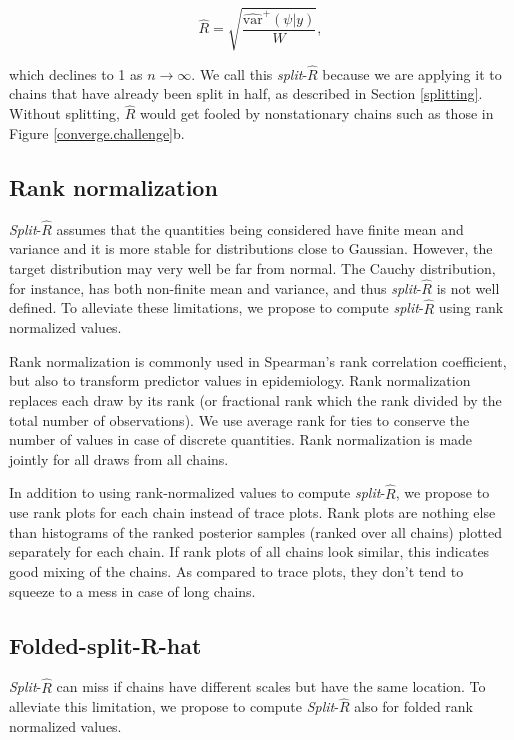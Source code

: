 \documentclass[11pt]{article}
\begin{document}
\begin{equation}
\label{rhat.defined}
\widehat{R} = \sqrt{\frac{\widehat{\mbox{var}}^+(\psi|y)}{W}},
\end{equation}

which declines to 1 as $n\rightarrow\infty$. We call this {\em split}-$\widehat{R}$ 
because we are applying it to chains that have already been split in half, as 
described in Section \ref{splitting}. Without splitting, $\widehat{R}$ would 
get fooled by nonstationary chains such as those in Figure 
\ref{converge.challenge}b.

\subsection{Rank normalization}

{\em Split}-$\widehat{R}$ assumes that the quantities being considered
have finite mean and variance and it is more stable for distributions
close to Gaussian. However, the target distribution may very well be far 
from normal. The Cauchy distribution, for instance, has both non-finite 
mean and variance, and thus {\em split}-$\widehat{R}$ is not well defined.
To alleviate these limitations, we propose to compute {\em split}-$\widehat{R}$ 
using rank normalized values.

Rank normalization is commonly used in Spearman's rank correlation
coefficient, but also to transform predictor values in epidemiology.
Rank normalization replaces each draw by its rank (or fractional rank
which the rank divided by the total number of observations). We use
average rank for ties to conserve the number of values in
case of discrete quantities. Rank normalization is made jointly for
all draws from all chains.

In addition to using rank-normalized values to compute
{\em split}-$\widehat{R}$, we propose to use rank plots for each chain
instead of trace plots. Rank plots are nothing else than histograms of the 
ranked posterior samples (ranked over all chains) plotted separately
for each chain. If rank plots of all chains look similar, this indicates
good mixing of the chains. As compared to trace plots, they don't tend
to squeeze to a mess in case of long chains.

\subsection{Folded-split-R-hat}

{\em Split}-$\widehat{R}$ can miss if chains have different scales but
have the same location. To alleviate this limitation, we propose to compute
{\em Split}-$\widehat{R}$ also for folded rank normalized values.
\end{document}
